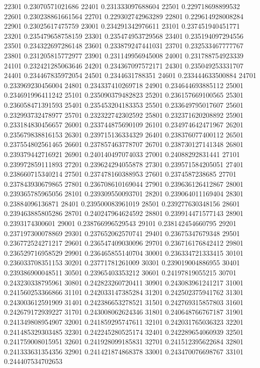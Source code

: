 {22301 0.23070571021686
22401 0.231333097688604
22501 0.229718698899532
22601 0.230238861661564
22701 0.229302742963289
22801 0.229614928008284
22901 0.23025617475759
23001 0.234291342976611
23101 0.237451940451771
23201 0.235479658758159
23301 0.235474953729568
23401 0.235194097294556
23501 0.234322697286148
23601 0.233879247441031
23701 0.232533467777767
23801 0.231205815772977
23901 0.231149956945008
24001 0.231788754923339
24101 0.232421285063646
24201 0.234367097572171
24301 0.235049253331707
24401 0.234467835972054
24501 0.2344631788351
24601 0.233444633500884
24701 0.233969230456004
24801 0.234337410269718
24901 0.234644693885112
25001 0.234691996411242
25101 0.235090379482823
25201 0.236157669100565
25301 0.236058471391593
25401 0.235453204183353
25501 0.233649795017607
25601 0.232993732478977
25701 0.232322742302592
25801 0.232371620208892
25901 0.233184830456657
26001 0.233744875690109
26101 0.234974642471967
26201 0.235679838816153
26301 0.239715136334329
26401 0.238376077400112
26501 0.237554802561465
26601 0.237857463778707
26701 0.238730127141348
26801 0.239379442716921
26901 0.240140497074033
27001 0.24088292831441
27101 0.239972859111893
27201 0.239624294055878
27301 0.239571584205051
27401 0.238660715340214
27501 0.237478160388953
27601 0.2374587238685
27701 0.237843930679865
27801 0.236708610169044
27901 0.239636126412867
28001 0.239365785965056
28101 0.239309550093701
28201 0.239064011169404
28301 0.23884096136871
28401 0.239500083961019
28501 0.239277630348156
28601 0.239463885805286
28701 0.240247964624592
28801 0.239914471577143
28901 0.2393174300601
29001 0.238766996529543
29101 0.238142454660795
29201 0.237197300078869
29301 0.237652062570741
29401 0.23675347679348
29501 0.236772524271217
29601 0.236547409030096
29701 0.236716176842412
29801 0.236529716958529
29901 0.236465855140704
30001 0.236334721333415
30101 0.236033708351153
30201 0.23771781261009
30301 0.239019004886955
30401 0.239386900048511
30501 0.23965403353212
30601 0.24197819055215
30701 0.243230338795961
30801 0.242823260720411
30901 0.243083961241217
31001 0.241560253366866
31101 0.242033147385284
31201 0.242502375941762
31301 0.243003612591909
31401 0.242386653278521
31501 0.242769315857803
31601 0.242679172939227
31701 0.243008062624346
31801 0.240648766767187
31901 0.241349808954907
32001 0.241859295747611
32101 0.242031765036323
32201 0.241485329303485
32301 0.242245280525174
32401 0.242289654060939
32501 0.241759008015951
32601 0.241928099185831
32701 0.241512395622684
32801 0.241333631354356
32901 0.241421874868378
33001 0.243470076698767
33101 0.244407534702653
}
